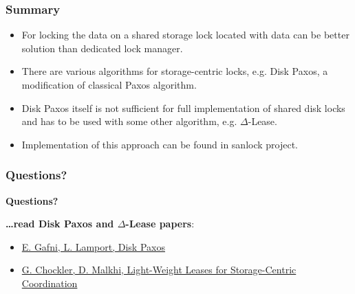 \documentclass[10pt,utf8]{beamer}
\begin{document}
\begin{frame}
    \frametitle{Summary}
    \begin{itemize}
     \item For locking the data on a shared storage lock located with data can be better solution than dedicated lock manager.
     \item There are various algorithms for storage-centric locks, e.g. Disk Paxos, a modification of classical Paxos algorithm.
     \item Disk Paxos itself is not sufficient for full implementation of shared disk locks and has to be used with some other algorithm, e.g. $\Delta$-Lease.
     \item Implementation of this approach can be found in sanlock project.
    \end{itemize}
\end{frame}

\begin{frame}
    \frametitle{Questions?}
    \centering
    \textbf{\Huge{Questions?}}
    
    \vspace{1cm}
    
    \centering
    \textbf{\dots read Disk Paxos and $\Delta$-Lease papers}:
    \vspace{0.5cm}
    \begin{itemize}
     \item \small\color{blue}\href{http://lamport.azurewebsites.net/pubs/disk-paxos-disc.pdf}{E. Gafni, L. Lamport, Disk Paxos}\color{black}
     \item \color{blue}\href{https://groups.csail.mit.edu/tds/papers/Chockler/TR934.ps}{G. Chockler, D. Malkhi, Light-Weight Leases for Storage-Centric Coordination}\color{black}
    \end{itemize}

\end{frame}
    
\end{document}
